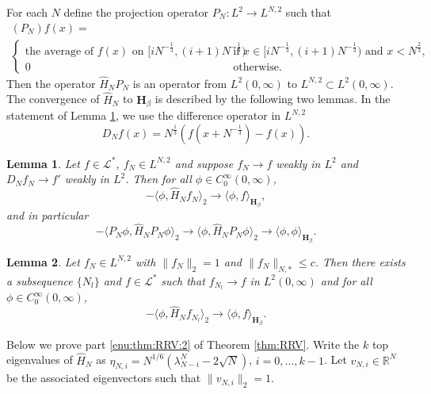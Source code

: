 \documentclass[11pt, a4paper]{article}
\numberwithin{equation}{section}
\newcommand{\realR}{\mathbb{R}}
\newcommand{\Lstar}{\mathcal{L}^*}
\newcommand{\Hbeta}{\mathbf{H}_{\beta}}
\newtheorem{lem}{Lemma}
\theoremstyle{definition}
\theoremstyle{remark}
\begin{document}
For each $N$ define the projection operator $P_N: L^2 \to L^{N, 2}$ such that
\begin{multline}
  (P_N)f(x) = \\
  \begin{cases}
    \text{the average of $f(x)$ on $[iN^{-\frac{1}{3}}, (i + 1)N^{-\frac{1}{3}})$} & \text{if $x \in [iN^{-\frac{1}{3}}, (i + 1)N^{-\frac{1}{3}})$ and $x < N^{\frac{2}{3}}$,} \\
      0 & \text{otherwise.}
  \end{cases}
\end{multline}
Then the operator $\hat{H}_N P_N$ is an operator from $L^2(0, \infty)$ to $L^{N, 2} \subset L^2(0, \infty)$. The convergence of $\hat{H}_N$ to $\Hbeta$ is described by the following two lemmas. In the statement of Lemma \ref{lem:convergence_H_N_to_Hbeta}, we use the difference operator in $L^{N, 2}$
\begin{equation}
  D_N f(x) = N^{\frac{1}{3}}(f(x + N^{-\frac{1}{3}}) - f(x)).
\end{equation}
\begin{lem} \label{lem:convergence_H_N_to_Hbeta}
  Let $f \in \Lstar$, $f_N \in L^{N, 2}$ and suppose $f_N \to f$ weakly in $L^2$ and $D_N f_N \to f'$ weakly in $L^2$. Then for all $\phi \in C^{\infty}_0(0, \infty)$,
  \begin{equation}
    -\langle \phi, \hat{H}_N f_N \rangle_2 \to \langle \phi, f \rangle_{\Hbeta},
  \end{equation}
  and in particular
  \begin{equation} \label{eq:convergence_H_N_to_Hbeta:particular}
    -\langle P_N \phi, \hat{H}_N P_N \phi \rangle_2 \to \langle \phi, \hat{H}_N P_N \phi \rangle_2 \to \langle \phi, \phi \rangle_{\Hbeta}.
  \end{equation}
\end{lem}

\begin{lem}
  Let $f_N \in L^{N, 2}$ with $\lVert f_N \rVert_2 = 1$ and $\lVert f_N \rVert_{N, *} \leq c$. Then there exists a subsequence $\{ N_l \}$ and $f \in \Lstar$ such that $f_{N_l} \to f$ in $L^2(0, \infty)$ and for all $\phi \in C^{\infty}_0(0, \infty)$,
  \begin{equation}
    -\langle \phi, \hat{H}_N f_{N_l} \rangle_2 \to \langle \phi, f \rangle_{\Hbeta}.
  \end{equation}
\end{lem}

Below we prove part \ref{enu:thm:RRV:2} of Theorem \ref{thm:RRV}. Write the $k$ top eigenvalues of $\hat{H}_N$ as $\eta_{N, i} = N^{1/6}(\lambda^N_{N - i} - 2\sqrt{N})$, $i = 0, \dotsc, k - 1$. Let $v_{N, i} \in \realR^N$ be the associated eigenvectors such that $\lVert v_{N, i} \rVert_2 = 1$.
\end{document}
